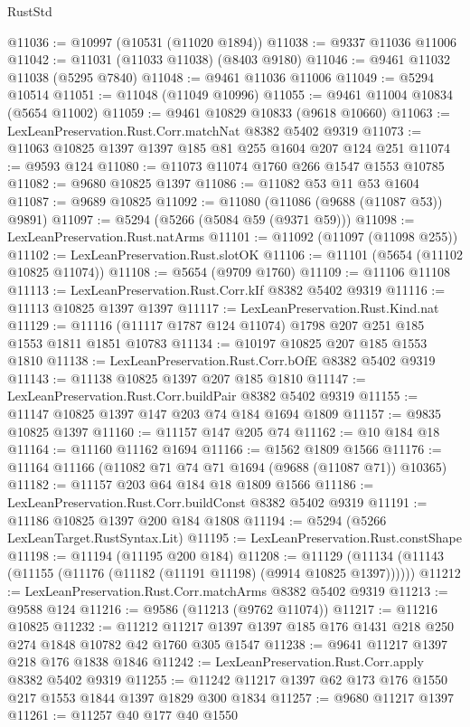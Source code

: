 \begin{lexlean}{RustStd}
\begin{coremodule}
@11036 := @10997 (@10531 (@11020 @1894))
@11038 := @9337 @11036 @11006
@11042 := @11031 (@11033 @11038) (@8403 @9180)
@11046 := @9461 @11032 @11038 (@5295 @7840)
@11048 := @9461 @11036 @11006
@11049 := @5294 @10514
@11051 := @11048 (@11049 @10996)
@11055 := @9461 @11004 @10834 (@5654 @11002)
@11059 := @9461 @10829 @10833 (@9618 @10660)
@11063 := LexLeanPreservation.Rust.Corr.matchNat @8382 @5402 @9319
@11073 := @11063 @10825 @1397 @1397 @185 @81 @255 @1604 @207 @124 @251
@11074 := @9593 @124
@11080 := @11073 @11074 @1760 @266 @1547 @1553 @10785
@11082 := @9680 @10825 @1397
@11086 := @11082 @53 @11 @53 @1604
@11087 := @9689 @10825
@11092 := @11080 (@11086 (@9688 (@11087 @53)) @9891)
@11097 := @5294 (@5266 (@5084 @59 (@9371 @59)))
@11098 := LexLeanPreservation.Rust.natArms
@11101 := @11092 (@11097 (@11098 @255))
@11102 := LexLeanPreservation.Rust.slotOK
@11106 := @11101 (@5654 (@11102 @10825 @11074))
@11108 := @5654 (@9709 @1760)
@11109 := @11106 @11108
@11113 := LexLeanPreservation.Rust.Corr.kIf @8382 @5402 @9319
@11116 := @11113 @10825 @1397 @1397
@11117 := LexLeanPreservation.Rust.Kind.nat
@11129 := @11116 (@11117 @1787 @124 @11074) @1798 @207 @251 @185 @1553 @1811 @1851 @10783
@11134 := @10197 @10825 @207 @185 @1553 @1810
@11138 := LexLeanPreservation.Rust.Corr.bOfE @8382 @5402 @9319
@11143 := @11138 @10825 @1397 @207 @185 @1810
@11147 := LexLeanPreservation.Rust.Corr.buildPair @8382 @5402 @9319
@11155 := @11147 @10825 @1397 @147 @203 @74 @184 @1694 @1809
@11157 := @9835 @10825 @1397
@11160 := @11157 @147 @205 @74
@11162 := @10 @184 @18
@11164 := @11160 @11162 @1694
@11166 := @1562 @1809 @1566
@11176 := @11164 @11166 (@11082 @71 @74 @71 @1694 (@9688 (@11087 @71)) @10365)
@11182 := @11157 @203 @64 @184 @18 @1809 @1566
@11186 := LexLeanPreservation.Rust.Corr.buildConst @8382 @5402 @9319
@11191 := @11186 @10825 @1397 @200 @184 @1808
@11194 := @5294 (@5266 LexLeanTarget.RustSyntax.Lit)
@11195 := LexLeanPreservation.Rust.constShape
@11198 := @11194 (@11195 @200 @184)
@11208 := @11129 (@11134 (@11143 (@11155 (@11176 (@11182 (@11191 @11198) (@9914 @10825 @1397))))))
@11212 := LexLeanPreservation.Rust.Corr.matchArms @8382 @5402 @9319
@11213 := @9588 @124
@11216 := @9586 (@11213 (@9762 @11074))
@11217 := @11216 @10825
@11232 := @11212 @11217 @1397 @1397 @185 @176 @1431 @218 @250 @274 @1848 @10782 @42 @1760 @305 @1547
@11238 := @9641 @11217 @1397 @218 @176 @1838 @1846
@11242 := LexLeanPreservation.Rust.Corr.apply @8382 @5402 @9319
@11255 := @11242 @11217 @1397 @62 @173 @176 @1550 @217 @1553 @1844 @1397 @1829 @300 @1834
@11257 := @9680 @11217 @1397
@11261 := @11257 @40 @177 @40 @1550

\end{coremodule}
\end{lexlean}
